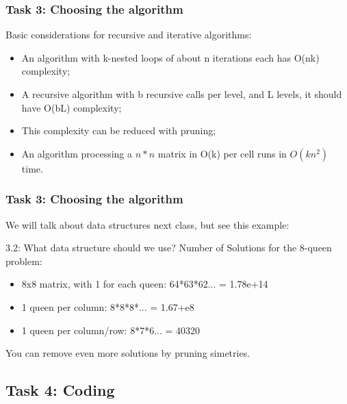 \documentclass{beamer}
\begin{document}
\begin{frame}
  \frametitle{Task 3: Choosing the algorithm}
  Basic considerations for recursive and iterative algorithms:

  \begin{itemize}
  \item An algorithm with k-nested loops of about n iterations each
    has O(nk) complexity;
  \item A recursive algorithm with b recursive calls per level, and L
    levels, it should have O(bL) complexity;
  \item This complexity can be reduced with pruning;
  \item An algorithm processing a $n*n$ matrix in O(k) per cell runs
    in $O(kn^2)$ time. 
  \end{itemize}
\end{frame}

\begin{frame}
  \frametitle{Task 3: Choosing the algorithm}
  
  We will talk about data structures next class, but see this example:

  \begin{block}{3.2: What data structure should we use?}
    Number of Solutions for the 8-queen problem:
    \begin{itemize}
    \item 8x8 matrix, with 1 for each queen: 64*63*62... = 1.78e+14
    \item 1 queen per column: 8*8*8*... = 1.67+e8
    \item 1 queen per column/row: 8*7*6... = 40320
    \end{itemize}

    \bigskip

    You can remove even more solutions by pruning simetries.
  \end{block}
\end{frame}

\subsection{Task 4: Coding}
\end{document}
